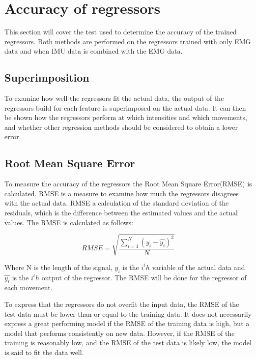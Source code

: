 \section{Accuracy of regressors}

This section will cover the test used to determine the accuracy of the trained regressors. Both methods are performed on the regressors trained with only EMG data and when IMU data is combined with the EMG data. 

\subsection{Superimposition}
To examine how well the regressors fit the actual data, the output of the regressors build for each feature is superimposed on the actual data. It can then be shown how the regressors perform at which intensities and which movements, and whether other regression methods should be considered to obtain a lower error.  


\subsection{Root Mean Square Error}
To measure the accuracy of the regressors the Root Mean Square Error(RMSE) is calculated. RMSE is a measure to examine how much the regressors disagrees with the actual data. RMSE a calculation of the standard deviation of the residuals, which is the difference between the estimated values and the actual values. The RMSE is calculated as follows:

\begin{equation}
RMSE = \sqrt{\frac{\sum\limits_{i=1}^N(y_i - \hat{y_i})^2}{N}}
\end{equation}

Where N is the length of the signal, $y_i$ is the $i^th$ variable of the actual data and $\hat{y_i}$ is the $i^th$ output of the regressor. The RMSE will be done for the regressor of each movement.

To express that the regressors do not overfit the input data, the RMSE of the test data must be lower than or equal to the training data. It does not necessarily express a great performing model if the RMSE of the training data is high, but a model that performs consistently on new data. However, if the RMSE of the training is reasonably low, and the RMSE of the test data is likely low, the model is said to fit the data well. 
